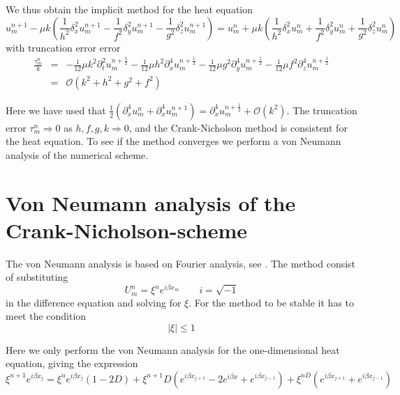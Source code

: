 We thus obtain the implicit method for the heat equation
\begin{equation}
u_m^{n+1}-\mu k(\frac{1}{h^2}\delta_x^2 u_m^{n+1}-\frac{1}{f^2}\delta_y^2 u_m^{n+1}-\frac{1}{g^2}\delta_z^2 u_m^{n+1})=u_m^n + \mu k(\frac{1}{h^2}\delta_x^2 u_m^n + \frac{1}{f^2}\delta_y^2 u_m^n +\frac{1}{g^2}\delta_z^2 u_m^n)
\label{crank}
\end{equation}
with truncation error error
\begin{eqnarray}
\frac{\tau_m^ n}{k} &=& -\frac{1}{12} \mu k^2 \partial_t^2 u_m^{n+\frac{1}{2}} - \frac{1}{12} \mu h^2 \partial_x^4 u_m^{n+\frac{1}{2}} - \frac{1}{12} \mu g^2 \partial_y^4 u_m^{n+\frac{1}{2}} - \frac{1}{12} \mu f^2 \partial_z^4 u_m^{n+\frac{1}{2}}\\
&=& \mathcal{O} (k^2 + h^2 + g^2 + f^2)
\label{truncerror}
\end{eqnarray}

Here we have used that $\frac{1}{2}(\partial_x^4 u_m^n + \partial_x^4 u_m^{n+1}) = \partial_x^4 u_m^{n+\frac{1}{2}} + \mathcal{O} (k^2)$. 
The truncation error $\tau_m^n \Rightarrow 0$ as $h,f,g,k \Rightarrow 0$, and the Crank-Nicholson method is consistent for the heat equation. To see if the method converges we perform a von Neumann analysis of the numerical scheme.

\section{Von Neumann analysis of the Crank-Nicholson-scheme}

The von Neumann analysis is based on Fourier analysis, see \cite{aarseth}. The method consist of substituting 
\begin{equation*}
	U_m^n=\xi^n e^{i \beta x_m} \quad \quad  i=\sqrt{-1}
\end{equation*}
in the difference equation and solving for $\xi$.
For the method to be stable it has to meet the condition
\begin{equation}
	\mid{\xi}\mid \leq 1
	\label{stabcond}
\end{equation}

Here we only perform the von Neumann analysis for the one-dimensional heat
equation, giving the expression
\begin{equation*}
\xi^{n+1} e^{i\beta x_{j}} = \xi^{n} e^{i\beta x_j}\left(1-2D\right) + \xi^{n+1}D\left(e^{i\beta x_{j+1}} - 2e^{i\beta  x} + e^{i\beta x_{j-1}}\right) + \xi^{nD}\left(e^{i\beta x_{j+1}} + e^{i\beta x_{j-1}}\right)
\end{equation*}

